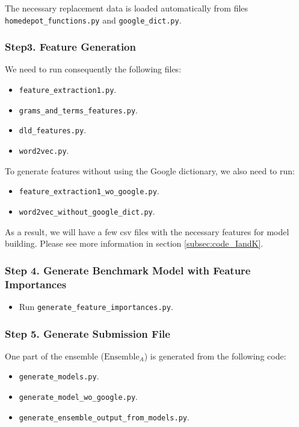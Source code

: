\documentclass[12pt]{article}
\begin{document}
{{\begin{appendices}
The necessary replacement data is loaded automatically from files  \texttt{homedepot\_functions.py} and \texttt{google\_dict.py}.
\subsubsection{Step3. Feature Generation}
\label{subsubsec:README_Igor_Kostia}

We need to run consequently the following files:
\begin{itemize}
\item \texttt{feature\_extraction1.py}.
\item \texttt{grams\_and\_terms\_features.py}.
\item  \texttt{dld\_features.py}.
\item \texttt{word2vec.py}.
\end{itemize}

To generate features without using the Google dictionary, we also need to run:
\begin{itemize}
\item \texttt{feature\_extraction1\_wo\_google.py}.
\item \texttt{word2vec\_without\_google\_dict.py}.
\end{itemize}

As a result, we will have a few csv files with the necessary features for model building. Please see more information in section \ref{subsec:code_IandK}.

\subsubsection{Step 4. Generate Benchmark Model with Feature Importances}
\begin{itemize}
\item Run \texttt{generate\_feature\_importances.py}.
\end{itemize}

\subsubsection{Step 5. Generate Submission File}
\label{subsubsec:generate_submission_IandK}
One part of the ensemble ($\text{Ensemble}_A$) is generated from the following code:
\begin{itemize}
\item \texttt{generate\_models.py}.
\item \texttt{generate\_model\_wo\_google.py}.
\item \texttt{generate\_ensemble\_output\_from\_models.py}.
\end{itemize}


\end{appendices}}}
\end{document}
